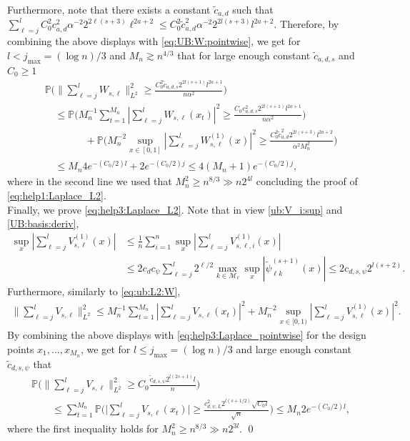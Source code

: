\documentclass[preprint]{imsart}
\renewcommand{\P}{\mathbb{P}}
\numberwithin{equation}{section}
\newcounter{cond}
\begin{document}
\begin{appendix}
Furthermore, note that there exists a constant $\tilde{c}_{a,d}$ such that $ \sum_{\ell=j}^{l}    C_0^2c_{a,d}^2\alpha^{-2} 2^{2\ell(s+3)}\ell^{2a+2}\leq    C_0^2\tilde{c}_{a,d}^2 \alpha^{-2}  2^{2l(s+3)}l^{2a+2}$.
Therefore, by combining the above displays with \eqref{eq:UB:W:pointwise}, we get for $l<j_{\max}=(\log n)/3$ and $M_n\gtrsim n^{4/3}$ that for large enough constant $ \tilde{c}_{a,d,s}$ and $C_0\geq 1$
\begin{align*}
&\P\Big( \|  \sum_{\ell=j}^{l}  W_{s,\ell}\|_{L^2}^2\geq   \frac{C_0^2 \tilde{c}_{a,d,s} 2^{2l(s+1)} l^{2a+1}}{n\alpha^2} \Big)\\
&\quad\leq 
\P\Big( M_n^{-1}\sum_{t=1}^{M_n} | \sum_{\ell=j}^{l}  W_{s,\ell}(x_t)|^2\geq   \frac{C_0 c_{a,d,s}^2 2^{2l(s+1)}l^{2a+1}}{n\alpha^2} \Big)\\
&\qquad\qquad+\P\Big( M_n^{-2}\sup_{x\in[0,1]}| \sum_{\ell=j}^{l}  W_{s,\ell}^{(1)}(x)|^2  \geq   \frac{C_0^2\tilde{c}_{a,d}^2  2^{2l(s+3)}l^{2a+2} }{\alpha^2M_n^2} \Big)\\
&\quad\leq M_n 4e^{-(C_0/2)l}+ 2 e^{-(C_0/2)j}\leq 4 (M_n+1)  e^{-(C_0/2)j},
\end{align*}
where in the second line we used that $M_n^2\geq n^{8/3}\gg n 2^{4l}$
concluding the proof of  \eqref{eq:help1:Laplace_L2}.\\



Finally, we prove \eqref{eq:help3:Laplace_L2}. Note that in view \eqref{ub:V_i:sup} and \eqref{UB:basis:deriv},
\begin{align*}
\sup_x| \sum_{\ell=j}^{l} V_{s,\ell}^{(1)}(x)|&\leq \frac{1}{n} \sum_{i=1}^n\sup_x |\sum_{\ell=j}^{l} V_{s,\ell,i}^{(1)}(x)|\\
&\leq 2c_d c_{\psi} \sum_{\ell=j}^{l}  2^{\ell/2}\max_{k\in \mathcal{M}_\ell} \sup_{x} |\tilde\psi_{\ell k}^{(s+1)}(x)|
\leq 2c_{d,s,\psi}2^{l (s+2)}. 
\end{align*}
Furthermore, similarly to \eqref{eq:ub:L2:W},
\begin{align*}
\|\sum_{\ell=j}^{l} V_{s,\ell}\|_{L^2}^2 \leq M_n^{-1}\sum_{t=1}^{M_n} |\sum_{\ell=j}^{l}V_{s,\ell}(x_t)|^2+ M_n^{-2} \sup_{x\in[0,1)}|\sum_{\ell=j}^{l} V_{s,\ell}^{(1)}(x)|^2.
\end{align*}
By combining the above displays with \eqref{eq:help3:Laplace_pointwise} for the design points $x_1,...,x_{M_n}$, we get for $l\leq j_{\max}=(\log n)/3$ and large enough constant $\tilde{c}_{d,s,\psi}$ that
\begin{align*}
&\P\Big( \|\sum_{\ell=j}^{l} V_{s,\ell}\|_{L^2}^2\geq   C_0\frac{\tilde{c}_{d,s,\psi} 2^{l (2s+1)}l}{n} \Big)\\
&\qquad\leq 
 \sum_{t=1}^{M_n} \P\Big(  \Big|\sum_{\ell=j}^{l} V_{s,\ell}(x_t)\Big|\geq  \frac{c_{d,\psi,L}^2 2^{l (s+1/2)}\sqrt{C_0 l}}{\sqrt{n}}\Big)
\leq M_n 2 e^{-(C_0/2)l},
\end{align*}
where the first inequality holds for $M_n^2\geq n^{8/3} \gg  n2^{3l}$. \hfill\qed






\end{appendix}
\end{document}
